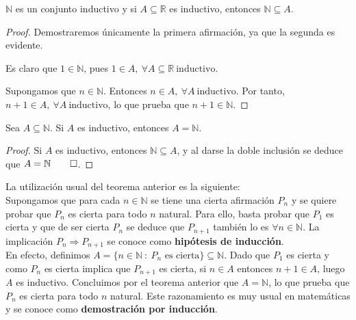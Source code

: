 \begin{teo}
    $\mathbb{N}$ es un conjunto inductivo y si $A \subseteq \mathbb{R}$ es inductivo, entonces $\mathbb{N} \subseteq A$.
\end{teo}
\begin{proof}
    Demostraremos únicamente la primera afirmación, ya que la segunda es evidente.
    
    Es claro que $1 \in \mathbb{N}$, pues $1 \in A, ~\forall A \subseteq \mathbb{R} ~\text{inductivo}$.
    
    Supongamos que $n \in \mathbb{N}$. Entonces $n \in A, ~\forall A ~\text{inductivo}$. Por tanto,
    $n+1 \in A, ~\forall A ~\text{inductivo}$, lo que prueba que $n+1 \in \mathbb{N}$.
\end{proof}

\begin{teo}
    Sea $A \subseteq \mathbb{N}$. Si $A$ es inductivo, entonces $A = \mathbb{N}$.
\end{teo}
\begin{proof}
    Si $A$ es inductivo, entonces $\mathbb{N} \subseteq A$, y al darse la doble inclusión se deduce que $A = \mathbb{N} \qed$.
\end{proof}

\vspace{0.5cm}
La utilización usual del teorema anterior es la siguiente:\\

Supongamos que para cada $n \in \mathbb{N}$ se tiene una cierta afirmación $P_n$ y se quiere probar que
$P_n$ es cierta para todo $n$ natural. Para ello, basta probar que $P_1$ es cierta y que de ser cierta
$P_n$ se deduce que $P_{n+1}$ también lo es $\forall n \in \mathbb{N}$. La implicación $P_n \Longrightarrow P_{n+1}$
se conoce como \textbf{hipótesis de inducción}.\\

En efecto, definimos $A = \{n \in \mathbb{N} ~:~\text{$P_n$ es cierta}\} \subseteq \mathbb{N}$. Dado que $P_1$ es cierta y como
$P_n$ es cierta implica que $P_{n+1}$ es cierta, si $n \in A$ entonces $n+1 \in A$, luego $A$
es inductivo. Concluimos por el teorema anterior que $A = \mathbb{N}$, lo que prueba que $P_n$ es cierta para todo $n$
natural. Este razonamiento es muy usual en matemáticas y se conoce como \textbf{demostración por inducción}.

